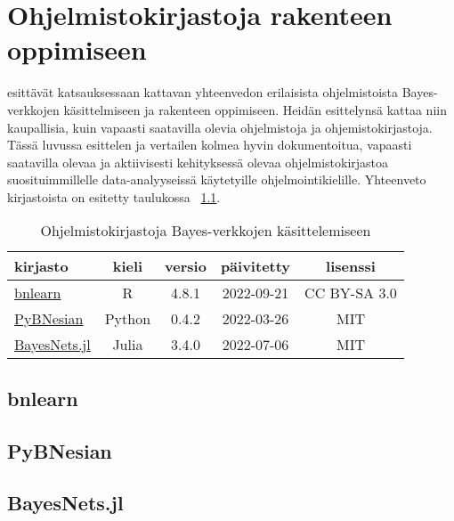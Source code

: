 \chapter{Ohjelmistokirjastoja rakenteen oppimiseen\label{software}}
\citet{scanagatta_survey_2019} esittävät katsauksessaan kattavan yhteenvedon erilaisista ohjelmistoista Bayes-verkkojen käsittelmiseen ja rakenteen oppimiseen. Heidän esittelynsä kattaa niin kaupallisia, kuin vapaasti saatavilla olevia ohjelmistoja ja ohjemistokirjastoja. Tässä luvussa esittelen ja vertailen kolmea hyvin dokumentoitua, vapaasti saatavilla olevaa ja aktiivisesti kehityksessä olevaa ohjelmistokirjastoa suosituimmillelle data-analyyseissä käytetyille ohjelmointikielille. Yhteenveto kirjastoista on esitetty taulukossa ~\ref{table:softat}.

\begin{table}[ht]
\centering
\caption{Ohjelmistokirjastoja Bayes-verkkojen käsittelemiseen\label{table:softat}}
\begin{tabular}{l|| c c c c} 
kirjasto & kieli & versio & päivitetty & lisenssi \\
\hline \hline 
\href{https://www.bnlearn.com/}{bnlearn} & R & 4.8.1 & 2022-09-21 & CC BY-SA 3.0 \\
\href{https://github.com/davenza/PyBNesian}{PyBNesian} & Python & 0.4.2 & 2022-03-26 & MIT \\
\href{https://github.com/sisl/BayesNets.jl}{BayesNets.jl} & Julia & 3.4.0 & 2022-07-06 & MIT  \\
\hline
\end{tabular}
\end{table}
\section{bnlearn}

\section{PyBNesian}

\section{BayesNets.jl}


